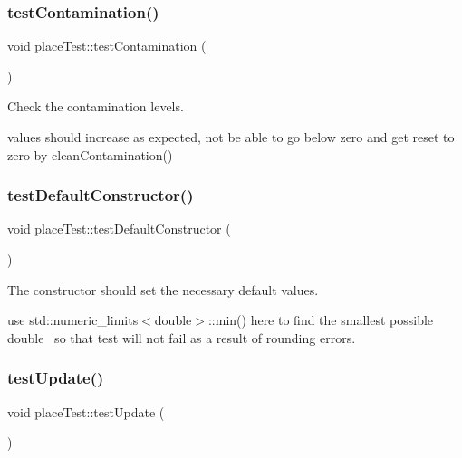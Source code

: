 \subsubsection{\texorpdfstring{test\+Contamination()}{testContamination()}}
{\footnotesize\ttfamily void place\+Test\+::test\+Contamination (\begin{DoxyParamCaption}{ }\end{DoxyParamCaption})\hspace{0.3cm}{\ttfamily [inline]}}



Check the contamination levels. 

values should increase as expected, not be able to go below zero and get reset to zero by clean\+Contamination() \mbox{\label{classplaceTest_a7f6879744d411bded42d786645595245}} 
\subsubsection{\texorpdfstring{test\+Default\+Constructor()}{testDefaultConstructor()}}
{\footnotesize\ttfamily void place\+Test\+::test\+Default\+Constructor (\begin{DoxyParamCaption}{ }\end{DoxyParamCaption})\hspace{0.3cm}{\ttfamily [inline]}}



The constructor should set the necessary default values. 

use std\+::numeric\+\_\+limits$<$double$>$\+::min() here to find the smallest possible double~\newline
so that test will not fail as a result of rounding errors. \mbox{\label{classplaceTest_acc20c36b8c0e62cea5068b3707e98237}} 
\subsubsection{\texorpdfstring{test\+Update()}{testUpdate()}}
{\footnotesize\ttfamily void place\+Test\+::test\+Update (\begin{DoxyParamCaption}{ }\end{DoxyParamCaption})\hspace{0.3cm}{\ttfamily [inline]}}



